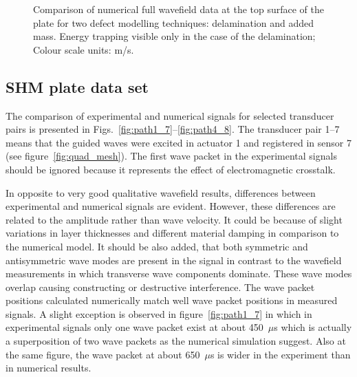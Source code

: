 \documentclass[12pt]{iopart}
\begin{document}
\begin{figure} [h!]
		\centering
		\hspace{0.5 cm} 	
	\caption{Comparison of numerical full wavefield data at the top surface of the plate for two defect modelling techniques: delamination and added mass. Energy trapping visible only in the case of the delamination; Colour scale units: m/s.} 
	\label{fig:wave_entrapment}
\end{figure}
\clearpage

\subsection{SHM plate data set}

The comparison of experimental and numerical signals for selected transducer pairs is presented in Figs.~\ref{fig:path1_7}--\ref{fig:path4_8}. The transducer pair 1--7 means that the guided waves were excited in actuator 1 and registered in sensor 7 (see figure~\ref{fig:quad_mesh}). The first wave packet in the experimental signals should be ignored because it represents the effect of electromagnetic crosstalk.

In opposite to very good qualitative wavefield results, differences between experimental and numerical signals are evident. However, these differences are related to the amplitude rather than wave velocity. It could be because of slight variations in layer thicknesses and different material damping in comparison to the numerical model. It should be also added, that both symmetric and antisymmetric wave modes are present in the signal in contrast to the wavefield measurements in which transverse wave components dominate. These wave modes overlap causing constructing or destructive interference. The wave packet positions calculated numerically match well wave packet positions in measured signals. A slight exception is observed in figure~\ref{fig:path1_7} in which in experimental signals only one wave packet exist at about 450~\(\mu\)s which is actually a superposition of two wave packets as the numerical simulation suggest. Also at the same figure, the wave packet at about 650~\(\mu\)s is wider in the experiment than in numerical results. 
\end{document}
